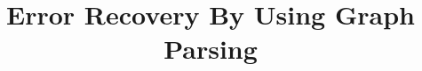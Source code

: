 \documentclass{sig-alternate-05-2015}
\begin{document}
%

\title{Error Recovery By Using Graph Parsing}
%
%
%
%
%
\end{document}
